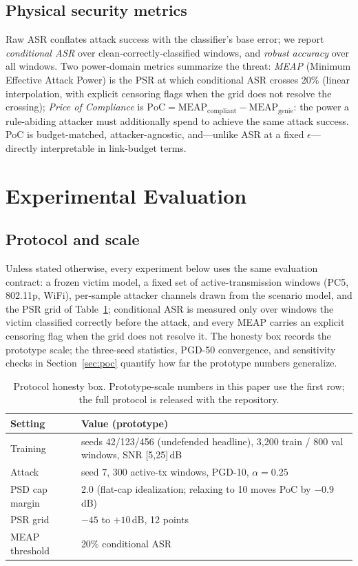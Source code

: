 \documentclass[review]{elsarticle}
\begin{document}
\subsection{Physical security metrics}
\label{sec:metrics}

Raw ASR conflates attack success with the classifier's base error; we
report \emph{conditional ASR} over clean-correctly-classified windows, and
\emph{robust accuracy} over all windows. Two power-domain metrics summarize
the threat: \emph{MEAP} (Minimum Effective Attack Power) is the PSR at which
conditional ASR crosses 20\% (linear interpolation, with explicit censoring
flags when the grid does not resolve the crossing); \emph{Price of
Compliance} is $\mathrm{PoC} = \mathrm{MEAP}_{\mathrm{compliant}} -
\mathrm{MEAP}_{\mathrm{genie}}$: the power a rule-abiding attacker must
additionally spend to achieve the same attack success. PoC is
budget-matched, attacker-agnostic, and---unlike ASR at a fixed
$\epsilon$---directly interpretable in link-budget terms.

\section{Experimental Evaluation}
\label{sec:experiments}

\subsection{Protocol and scale}
\label{sec:protocol}

Unless stated otherwise, every experiment below uses the same evaluation
contract: a frozen victim model, a fixed set of active-transmission windows
(PC5, 802.11p, WiFi), per-sample attacker channels drawn from the scenario
model, and the PSR grid of Table~\ref{tab:protocol}; conditional ASR is
measured only over windows the victim classified correctly before the
attack, and every MEAP carries an explicit censoring flag when the grid
does not resolve it. The honesty box records the prototype scale; the
three-seed statistics, PGD-50 convergence, and sensitivity checks in
Section~\ref{sec:poc} quantify how far the prototype numbers generalize.

\begin{table}[h]
\centering
\caption{Protocol honesty box. Prototype-scale numbers in this paper use the
first row; the full protocol is released with the repository.}
\label{tab:protocol}
\small
\begin{tabular}{ll}
\toprule
Setting & Value (prototype) \\
\midrule
Training & seeds 42/123/456 (undefended headline), 3{,}200 train / 800 val windows, SNR [5,25]\,dB \\
Attack & seed 7, 300 active-tx windows, PGD-10, $\alpha=0.25$ \\
PSD cap margin & 2.0 (flat-cap idealization; relaxing to 10 moves PoC by $-0.9$\,dB) \\
PSR grid & $-45$ to $+10$\,dB, 12 points \\
MEAP threshold & 20\% conditional ASR \\
\bottomrule
\end{tabular}
\end{table}
\end{document}
